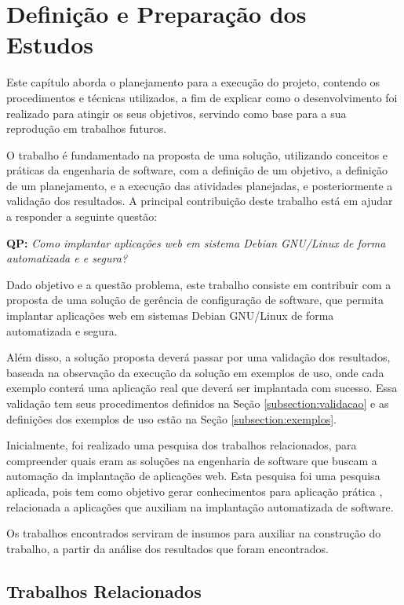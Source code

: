 \chapter{Definição e Preparação dos Estudos}

\label{cap-metodologia}
Este capítulo aborda o planejamento para a execução do projeto,
contendo os procedimentos e técnicas utilizados, a fim de
explicar como o desenvolvimento foi realizado para atingir os seus objetivos,
servindo como base para a sua reprodução em trabalhos futuros.

O trabalho é fundamentado na proposta de uma solução, utilizando conceitos e práticas
da engenharia de software, com a definição de um objetivo, a definição de um planejamento,
e a execução das atividades planejadas, e posteriormente a validação dos resultados. 
A principal contribuição deste trabalho está em ajudar a responder a seguinte questão:

\begin{center}
 \textbf{QP:}
  \textit{
  Como implantar aplicações web em sistema Debian GNU/Linux de forma automatizada e
  e segura?
}
\end{center}

Dado objetivo e a questão problema, este trabalho consiste em contribuir
com a proposta de uma solução de gerência de configuração de software, que permita implantar
aplicações web em sistemas Debian GNU/Linux de forma automatizada e segura.

Além disso, a solução proposta deverá passar
por uma validação dos resultados, baseada na observação
da execução da solução em exemplos de uso, onde cada exemplo conterá uma aplicação
real que deverá ser implantada com sucesso. Essa validação tem seus procedimentos
definidos na Seção \ref{subsection:validacao} e as definições dos exemplos de uso
estão na Seção \ref{subsection:exemplos}.

Inicialmente, foi realizado uma pesquisa dos trabalhos relacionados, para compreender
quais eram as soluções na engenharia de software que buscam a automação da implantação
de aplicações web. Esta pesquisa foi uma pesquisa aplicada, pois tem como objetivo
gerar conhecimentos para aplicação prática \cite{gerhardt2009metodos},
relacionada a aplicações que auxiliam na implantação automatizada de software.

Os trabalhos encontrados serviram de insumos para auxiliar na construção do trabalho, 
a partir da análise dos resultados que foram encontrados. 

\section{Trabalhos Relacionados}
\label{section:trabalhos_relacionados}


